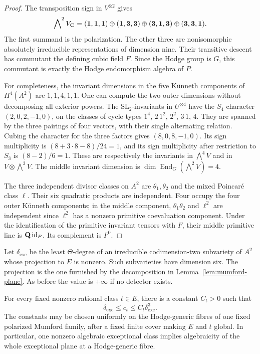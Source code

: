 \begin{proof}
The transposition sign in $V^{\otimes2}$ gives
\[
 \bigwedge\nolimits^2V_{\mathbf C}
  =(\mathbf1,\mathbf1,\mathbf1)
   \oplus(\mathbf1,\mathbf3,\mathbf3)
   \oplus(\mathbf3,\mathbf1,\mathbf3)
   \oplus(\mathbf3,\mathbf3,\mathbf1).
\]
The first summand is the polarization. The other three are
nonisomorphic absolutely irreducible representations of dimension nine.
Their transitive descent has commutant the defining cubic field $F$.
Since the Hodge group is $G$, this commutant is exactly the Hodge
endomorphism algebra of $P$.

For completeness, the invariant dimensions in the five K\"unneth
components of $H^4(A^2)$ are $1,1,4,1,1$. One can compute the two outer
dimensions without decomposing all exterior powers. The
$\mathrm{SL}_2$-invariants in $U^{\otimes4}$ have the $S_4$ character
$(2,0,2,-1,0)$, on the classes of cycle types
$1^4,\,2\,1^2,\,2^2,\,3\,1,\,4$. They are spanned by the three pairings
of four vectors, with their single alternating relation. Cubing the
character for the three factors gives $(8,0,8,-1,0)$.
Its sign multiplicity is
$(8+3\cdot8-8)/24=1$, and its sign multiplicity after restriction
to $S_3$ is $(8-2)/6=1$. These are respectively the invariants in
$\bigwedge^4V$ and in $V\otimes\bigwedge^3V$. The middle invariant
dimension is $\dim\operatorname{End}_G(\bigwedge^2V)=4$.

The three independent divisor classes on $A^2$ are
$\theta_1,\theta_2$ and the mixed Poincar\'e class $\ell$.
Their six quadratic products are independent. Four occupy the four
outer K\"unneth components; in the middle component,
$\theta_1\theta_2$ and $\ell^2$ are independent since $\ell^2$ has a
nonzero primitive coevaluation component. Under the identification of
the primitive invariant tensors with $F$, their middle primitive
line is $\mathbf Q\operatorname{id}_P$. Its complement is $F^0$.
\end{proof}

Let $\delta_{\mathrm{exc}}$ be the least $\Theta$-degree of an
irreducible codimension-two subvariety of $A^2$ whose projection to $E$
is nonzero. Such subvarieties have dimension six. The projection is the
one furnished by the decomposition in Lemma~\ref{lem:mumford-plane}.
As before the value is $+\infty$ if no detector exists.

\begin{theorem}\label{thm:mumford-cubic}
For every fixed nonzero rational class $t\in E$, there is a constant
$C_t>0$ such that
\[
 \delta_{\mathrm{exc}}\leq c_t\leq C_t\delta_{\mathrm{exc}}^3.
\]
The constants may be chosen uniformly on the Hodge-generic fibres of
one fixed polarized Mumford family, after a fixed finite cover making
$E$ and $t$ global. In particular, one nonzero algebraic exceptional
class implies algebraicity of the whole exceptional plane at a
Hodge-generic fibre.
\end{theorem}

